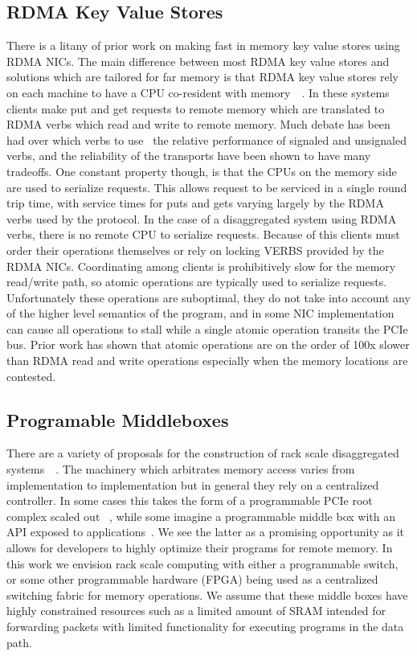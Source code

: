 \subsection{RDMA Key Value Stores}

There is a litany of prior work on making fast in memory key value stores using
RDMA NICs. The main difference between most RDMA key value stores and solutions
which are tailored for far memory is that RDMA key value stores rely on each
machine to have a CPU co-resident with memory~\cite{herd,pilaf,storm,sonuma,
MemC3}~. In these systems clients make put and get requests to remote memory
which are translated to RDMA verbs which read and write to remote memory. Much
debate has been had over which verbs to use~\cite{storm, herd, erpc} the
relative performance of signaled and unsignaled verbs, and the reliability of
the transports have been shown to have many tradeoffs. One constant property
though, is that the CPUs on the memory side are used to serialize requests. This
allows request to be serviced in a single round trip time, with service times
for puts and gets varying largely by the RDMA verbs used by the protocol. In the
case of a disaggregated system using RDMA verbs, there is no remote CPU to
serialize requests. Because of this clients must order their operations
themselves or rely on locking VERBS provided by the RDMA NICs. Coordinating
among clients is prohibitively slow for the memory read/write path, so atomic
operations are typically used to serialize requests. Unfortunately these
operations are suboptimal, they do not take into account any of the higher level
semantics of the program, and in some NIC implementation can cause all operations
to stall while a single atomic operation transits the PCIe bus. Prior work has
shown that atomic operations are on the order of 100x slower than RDMA read and
write operations especially when the memory locations are contested.

\subsection{Programable Middleboxes}

There are a variety of proposals for the construction of rack scale
disaggregated systems~\cite{firebox, beyond, disandapp}~. The machinery which arbitrates memory access varies from
implementation to implementation but in general they rely on a centralized
controller. In some cases this takes the form of a programmable PCIe root
complex scaled out ~, while some imagine a programmable
middle box with an API exposed to applications~\cite{disandapp}. We see the latter as a promising opportunity as it allows for
developers to highly optimize their programs for remote memory. In this work we
envision rack scale computing with either a programmable switch, or some other
programmable hardware (FPGA) being used as a centralized switching fabric for
memory operations. We assume that these middle boxes have highly constrained
resources such as a limited amount of SRAM intended for forwarding packets with
limited functionality for executing programs in the data path.

